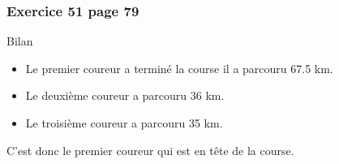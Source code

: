 \documentclass[xcolor={dvipsnames}]{beamer}
\begin{document}
\begin{frame}
	\frametitle{Exercice 51 page 79}
		
	\begin{block}{Bilan}
		\begin{itemize}
			\item Le premier coureur a terminé la course il a parcouru \num{67.5} km.
			\item Le deuxième coureur a parcouru \num{36} km.
			\item Le troisième coureur a parcouru \num{35} km. \pause
		\end{itemize} 
		
		

	\end{block}
	
	\vspace*{1cm}
	C'est donc le premier coureur qui est en tête de la course.
\end{frame}
\end{document}
